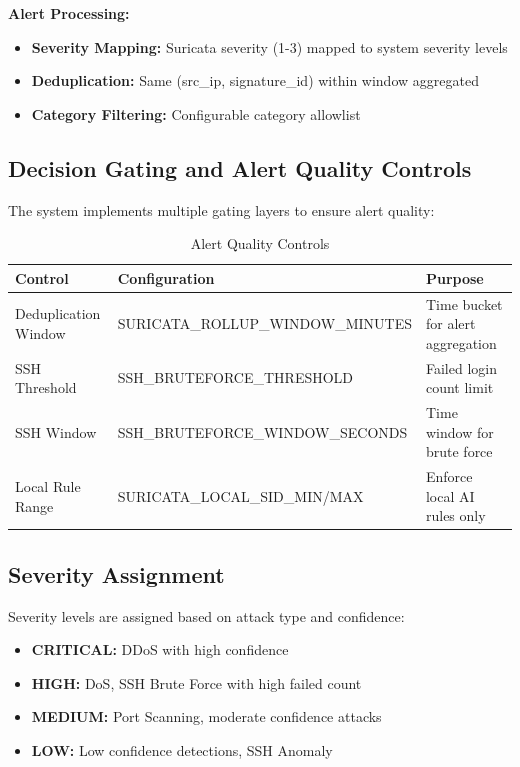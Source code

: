 \documentclass[12pt,a4paper]{report} %
\begin{document}
\textbf{Alert Processing:}
\begin{itemize}
	\item \textbf{Severity Mapping:} Suricata severity (1-3) mapped to system severity levels
	\item \textbf{Deduplication:} Same (src\_ip, signature\_id) within window aggregated
	\item \textbf{Category Filtering:} Configurable category allowlist
\end{itemize}

\subsection{Decision Gating and Alert Quality Controls}
The system implements multiple gating layers to ensure alert quality:

\begin{table}[H]
	\centering
	\caption{Alert Quality Controls}
	\label{tab:alert-controls}
	\begin{tabular}{|l|l|l|}
		\hline
		\textbf{Control} & \textbf{Configuration} & \textbf{Purpose} \\
		\hline
		Deduplication Window & SURICATA\_ROLLUP\_WINDOW\_MINUTES & Time bucket for alert aggregation \\
		SSH Threshold & SSH\_BRUTEFORCE\_THRESHOLD & Failed login count limit \\
		SSH Window & SSH\_BRUTEFORCE\_WINDOW\_SECONDS & Time window for brute force \\
		Local Rule Range & SURICATA\_LOCAL\_SID\_MIN/MAX & Enforce local AI rules only \\
		\hline
	\end{tabular}
\end{table}

\subsection{Severity Assignment}
Severity levels are assigned based on attack type and confidence:

\begin{itemize}
	\item \textbf{CRITICAL:} DDoS with high confidence
	\item \textbf{HIGH:} DoS, SSH Brute Force with high failed count
	\item \textbf{MEDIUM:} Port Scanning, moderate confidence attacks
	\item \textbf{LOW:} Low confidence detections, SSH Anomaly
\end{itemize}
\end{document}
